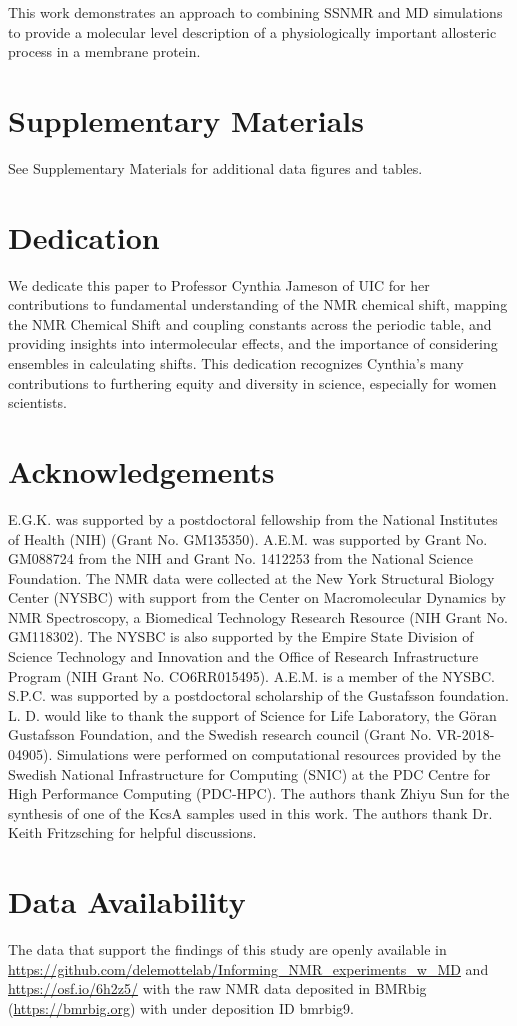 \documentclass[%
 aip,
 amsmath,amssymb,
 preprint,%
]{revtex4-1}
\begin{document}
This work demonstrates an approach to combining  SSNMR and MD simulations to provide a molecular level description of a physiologically important allosteric process in a membrane protein.

  
\section{Supplementary Materials}
See Supplementary Materials for additional data figures and tables. 

\section{Dedication}
We dedicate this paper to Professor Cynthia Jameson of UIC for her contributions to fundamental understanding of the NMR chemical shift, mapping the NMR Chemical Shift and coupling constants across the periodic table, and providing insights into intermolecular effects, and the importance of considering ensembles in calculating shifts.  This dedication recognizes Cynthia’s many contributions to furthering equity and diversity in science, especially for women scientists.

\section{Acknowledgements}
E.G.K. was supported by a postdoctoral fellowship from the National Institutes of Health (NIH) (Grant No. GM135350). A.E.M. was supported by Grant No. GM088724 from the NIH and Grant No. 1412253 from the National Science Foundation. The NMR data were collected at the New York Structural Biology Center (NYSBC) with support from the Center on Macromolecular Dynamics by NMR Spectroscopy, a Biomedical Technology Research Resource (NIH Grant No. GM118302). The NYSBC is also supported by the Empire State Division of Science Technology and Innovation and the Office of Research Infrastructure Program (NIH Grant No. CO6RR015495). A.E.M. is a member of the NYSBC.  S.P.C. was supported by a postdoctoral scholarship of the Gustafsson foundation. L. D. would like to thank the support of Science for Life Laboratory, the Göran Gustafsson Foundation, and the Swedish research council (Grant No. VR-2018-04905). Simulations were performed on computational resources provided by the Swedish National Infrastructure for Computing (SNIC) at the PDC Centre for High Performance Computing (PDC-HPC). The authors thank Zhiyu Sun for the synthesis of one of the KcsA samples used in this work. The authors thank Dr. Keith Fritzsching for helpful discussions.

\section{Data Availability}

The data that support the findings of this study are openly available in \url{https://github.com/delemottelab/Informing_NMR_experiments_w_MD} and \url{https://osf.io/6h2z5/} with the raw NMR data deposited in BMRbig (\url{https://bmrbig.org}) with under deposition ID bmrbig9.

\end{document}
